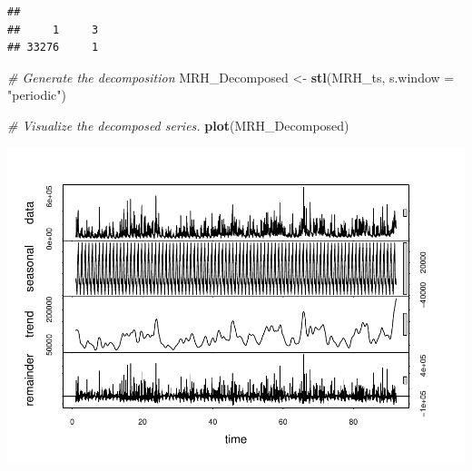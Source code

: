 \documentclass[12pt,]{article}
\newenvironment{Shaded}{\begin{snugshade}}{\end{snugshade}}
\newcommand{\CommentTok}[1]{\textcolor[rgb]{0.56,0.35,0.01}{\textit{#1}}}
\newcommand{\DataTypeTok}[1]{\textcolor[rgb]{0.13,0.29,0.53}{#1}}
\newcommand{\DecValTok}[1]{\textcolor[rgb]{0.00,0.00,0.81}{#1}}
\newcommand{\KeywordTok}[1]{\textcolor[rgb]{0.13,0.29,0.53}{\textbf{#1}}}
\newcommand{\NormalTok}[1]{#1}
\newcommand{\OperatorTok}[1]{\textcolor[rgb]{0.81,0.36,0.00}{\textbf{#1}}}
\newcommand{\StringTok}[1]{\textcolor[rgb]{0.31,0.60,0.02}{#1}}
\begin{document}
\begin{Shaded}
\end{Shaded}

\begin{verbatim}
## 
##     1     3 
## 33276     1
\end{verbatim}

\begin{Shaded}
\begin{Highlighting}[]
\CommentTok{# Generate the decomposition}
\NormalTok{MRH_Decomposed <-}\StringTok{ }\KeywordTok{stl}\NormalTok{(MRH_ts, }\DataTypeTok{s.window =} \StringTok{"periodic"}\NormalTok{)}

\CommentTok{# Visualize the decomposed series. }
\KeywordTok{plot}\NormalTok{(MRH_Decomposed)}
\end{Highlighting}
\end{Shaded}

\includegraphics{Project_Template_files/figure-latex/unnamed-chunk-6-11.pdf}
\end{document}
